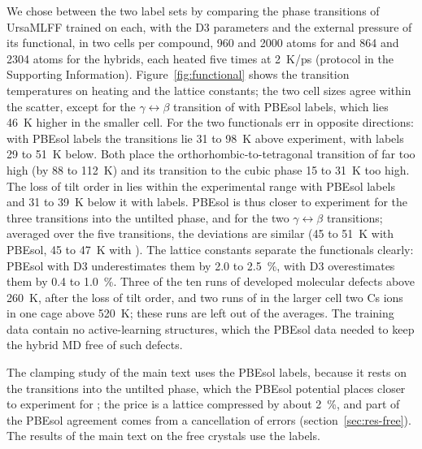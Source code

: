 {\changedcolor
We chose between the two label sets by comparing the phase transitions of UrsaMLFF trained on each, with
the D3 parameters and the external pressure of its functional, in two cells per compound, 960 and 2000
atoms for \CsSnI{} and 864 and 2304 atoms for the hybrids, each heated five times at \SI{2}{K/ps}
(protocol in the Supporting Information). Figure~\ref{fig:functional} shows the transition
temperatures on heating and the lattice constants; the two cell sizes agree within the scatter, except
for the $\gamma\leftrightarrow\beta$ transition of \CsSnI{} with PBEsol labels, which lies \SI{46}{K}
higher in the smaller cell. For \CsSnI{} the two functionals err in opposite directions: with PBEsol
labels the transitions lie 31 to \SI{98}{K} above experiment, with \rSCAN{} labels 29 to \SI{51}{K}
below. Both place the orthorhombic-to-tetragonal transition of \MASnI{} far too high (by 88 to
\SI{112}{K}) and its transition to the cubic phase 15 to \SI{31}{K} too high. The loss of tilt order in
\FASnI{} lies within the experimental range with PBEsol labels and 31 to \SI{39}{K} below it with \rSCAN{}
labels. PBEsol is thus closer to experiment for the three transitions into the untilted phase, and
\rSCAN{} for the two $\gamma\leftrightarrow\beta$ transitions; averaged over the five transitions, the
deviations are similar (45 to \SI{51}{K} with PBEsol, 45 to \SI{47}{K} with \rSCAN{}). The lattice
constants separate the functionals clearly: PBEsol with D3 underestimates them by 2.0 to
\SI{2.5}{\percent}, \rSCAN{} with D3 overestimates them by 0.4 to \SI{1.0}{\percent}. Three of the ten
\rSCAN{} runs of \FASnI{} developed molecular defects above \SI{260}{K}, after the loss of tilt order,
and two \rSCAN{} runs of \CsSnI{} in the larger cell two Cs ions in one cage above \SI{520}{K}; these
runs are left out of the averages. The \rSCAN{} training data contain no active-learning structures,
which the PBEsol data needed to keep the hybrid MD free of such defects.

The clamping study of the main text uses the PBEsol labels, because it rests on the transitions into the
untilted phase, which the PBEsol potential places closer to experiment for \CsSnI{}; the price is a lattice compressed
by about \SI{2}{\percent}, and part of the PBEsol agreement comes from a cancellation of errors
(section~\ref{sec:res-free}). The results of the main text on the free crystals use the \rSCAN{} labels.
}

